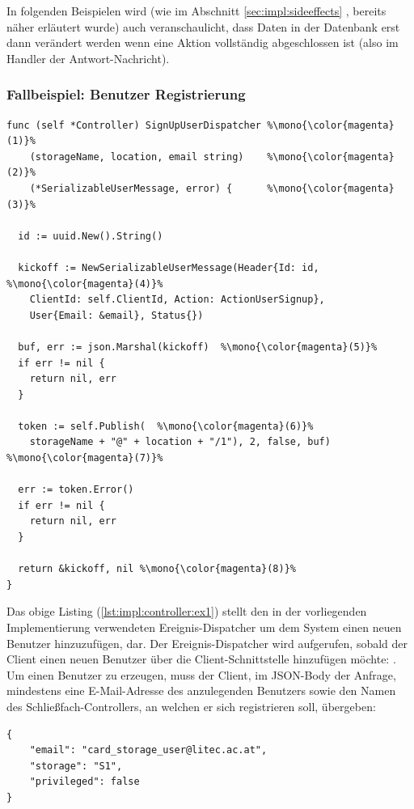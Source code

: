\noindent
In folgenden Beispielen wird (wie im Abschnitt \ref{sec:impl:sideeffects} , bereits näher erläutert wurde) auch veranschaulicht, dass Daten in der Datenbank erst dann verändert werden wenn eine Aktion vollständig abgeschlossen ist (also im Handler der Antwort-Nachricht).  

\newpage
\subsubsection{Fallbeispiel: Benutzer Registrierung}
\begin{lstlisting}[style=goMono, caption={\centering Dispatcher, um dem System einen neuen Benutzer hinzuzufügen}, label={lst:impl:controller:ex1}]
func (self *Controller) SignUpUserDispatcher %\mono{\color{magenta}(1)}%
    (storageName, location, email string)    %\mono{\color{magenta}(2)}%
    (*SerializableUserMessage, error) {      %\mono{\color{magenta}(3)}%
  
  id := uuid.New().String()

  kickoff := NewSerializableUserMessage(Header{Id: id, %\mono{\color{magenta}(4)}%
    ClientId: self.ClientId, Action: ActionUserSignup},
    User{Email: &email}, Status{})

  buf, err := json.Marshal(kickoff)  %\mono{\color{magenta}(5)}%
  if err != nil {
    return nil, err
  }

  token := self.Publish(  %\mono{\color{magenta}(6)}%
    storageName + "@" + location + "/1"), 2, false, buf) %\mono{\color{magenta}(7)}%
  
  err := token.Error()
  if err != nil {
    return nil, err
  }

  return &kickoff, nil %\mono{\color{magenta}(8)}%
}
\end{lstlisting}
Das obige Listing (\ref{lst:impl:controller:ex1}) stellt den in der vorliegenden Implementierung verwendeten Ereignis-Dispatcher um dem System einen neuen Benutzer hinzuzufügen, dar. Der Ereignis-Dispatcher  wird aufgerufen, sobald der Client einen neuen Benutzer über die Client-Schnittstelle hinzufügen möchte: .
\newpage
Um einen Benutzer zu erzeugen, muss der Client, im JSON-Body der Anfrage, mindestens eine E-Mail-Adresse des anzulegenden Benutzers sowie den Namen des Schließfach-Controllers, an welchen er sich registrieren soll, übergeben:
\begin{lstlisting}[style=goMono,caption={Benötigter JSON-Body um einen Benutzer anzulegen}]
{
    "email": "card_storage_user@litec.ac.at",
    "storage": "S1",
    "privileged": false
}
\end{lstlisting}
